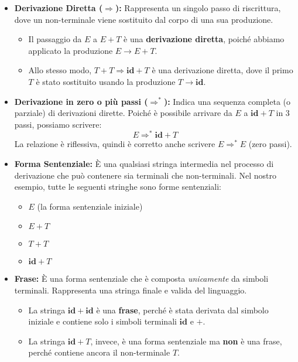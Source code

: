 \begin{itemize}
    \item \textbf{Derivazione Diretta ($\Rightarrow$):} 
    Rappresenta un singolo passo di riscrittura, dove un non-terminale viene sostituito dal corpo di una sua produzione. 
    \begin{itemize}
        \item Il passaggio da $E$ a $E + T$ è una \textbf{derivazione diretta}, poiché abbiamo applicato la produzione $E \rightarrow E + T$.
        \item Allo stesso modo, $T + T \Rightarrow \mathbf{id} + T$ è una derivazione diretta, dove il primo $T$ è stato sostituito usando la produzione $T \rightarrow \mathbf{id}$.
    \end{itemize}

    \item \textbf{Derivazione in zero o più passi ($\Rightarrow^*$):} 
    Indica una sequenza completa (o parziale) di derivazioni dirette. Poiché è possibile arrivare da $E$ a $\mathbf{id} + T$ in 3 passi, possiamo scrivere:
    \[ E \Rightarrow^* \mathbf{id} + T \]
    La relazione è riflessiva, quindi è corretto anche scrivere $E \Rightarrow^* E$ (zero passi).
    
    \item \textbf{Forma Sentenziale:} 
    È una qualsiasi stringa intermedia nel processo di derivazione che può contenere sia terminali che non-terminali. Nel nostro esempio, tutte le seguenti stringhe sono forme sentenziali:
    \begin{itemize}
        \item $E$ (la forma sentenziale iniziale)
        \item $E + T$
        \item $T + T$
        \item $\mathbf{id} + T$
    \end{itemize}

    \item \textbf{Frase:} 
    È una forma sentenziale che è composta \textit{unicamente} da simboli terminali. Rappresenta una stringa finale e valida del linguaggio.
    \begin{itemize}
        \item La stringa $\mathbf{id} + \mathbf{id}$ è una \textbf{frase}, perché è stata derivata dal simbolo iniziale e contiene solo i simboli terminali $\mathbf{id}$ e $+$.
        \item La stringa $\mathbf{id} + T$, invece, è una forma sentenziale ma \textbf{non} è una frase, perché contiene ancora il non-terminale $T$.
    \end{itemize}


\end{itemize}
